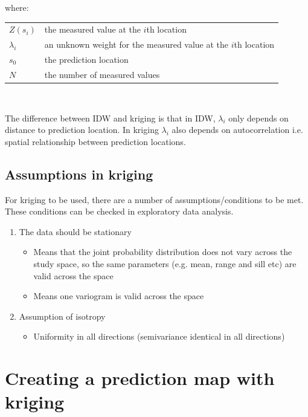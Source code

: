 \documentclass{article}
\makeatletter
\newenvironment{conditions}[1][where:] 
  {#1 \begin{tabular}[t]{>{$}l<{$} @{${}={}$} l}}
  {\end{tabular}\\[\belowdisplayskip]}
\makeatother
\begin{document}
\begin{conditions}
Z \left(s_{i}\right) & the measured value at the $i$th location \\
\lambda_{i} & an unknown weight for the measured value at the $i$th location \\
s_{0} & the prediction location \\
N & the number of measured values
\end{conditions}

The difference between IDW and kriging is that in IDW, $\lambda_{i}$ only depends on distance to prediction location.
In kriging $\lambda_{i}$ also depends on autocorrelation i.e. spatial relationship between prediction locations.

\subsection{Assumptions in kriging}

\begin{center}
\end{center}

For kriging to be used, there are a number of assumptions/conditions to be met.
These conditions can be checked in exploratory data analysis.

\begin{enumerate}
    \item The data should be stationary
    \begin{itemize}
        \item Means that the joint probability distribution does not vary across the study space, so the same parameters (e.g. mean, range and sill etc) are valid across the space
        \item Means one variogram is valid across the space
    \end{itemize}
    \item Assumption of isotropy
    \begin{itemize}
        \item Uniformity in all directions (semivariance identical in all directions)
    \end{itemize}
\end{enumerate}



\section{Creating a prediction map with kriging}
\end{document}
